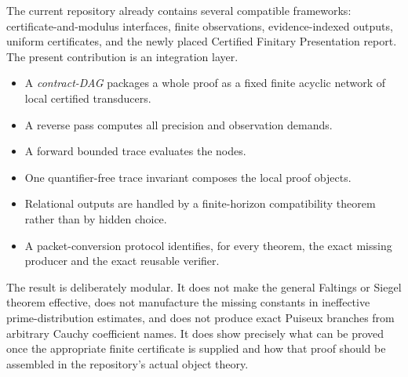 The current repository already contains several compatible frameworks:
certificate-and-modulus interfaces, finite observations, evidence-indexed
outputs, uniform certificates, and the newly placed Certified Finitary
Presentation report.  The present contribution is an integration layer.

\begin{itemize}[leftmargin=1.7em]
\item A \emph{contract-DAG} packages a whole proof as a fixed finite acyclic
      network of local certified transducers.
\item A reverse pass computes all precision and observation demands.
\item A forward bounded trace evaluates the nodes.
\item One quantifier-free trace invariant composes the local proof objects.
\item Relational outputs are handled by a finite-horizon compatibility
      theorem rather than by hidden choice.
\item A packet-conversion protocol identifies, for every theorem, the exact
      missing producer and the exact reusable verifier.
\end{itemize}

The result is deliberately modular.  It does not make the general Faltings or
Siegel theorem effective, does not manufacture the missing constants in
ineffective prime-distribution estimates, and does not produce exact Puiseux
branches from arbitrary Cauchy coefficient names.  It does show precisely
what can be proved once the appropriate finite certificate is supplied and
how that proof should be assembled in the repository's actual object theory.
